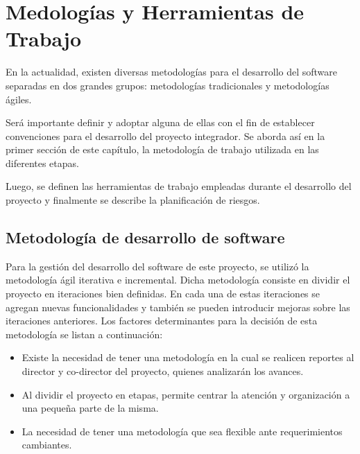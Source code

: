 
\chapter{Medologías y Herramientas de Trabajo} %

\label{Chapter5} %
En la actualidad, existen diversas metodologías para el desarrollo del software separadas en dos grandes grupos: metodologías tradicionales y metodologías ágiles. 

Será importante definir y adoptar alguna de ellas con el fin de establecer convenciones para el desarrollo del proyecto integrador. Se aborda así en la primer sección de este capítulo, la metodología de trabajo utilizada en las diferentes etapas.

Luego, se definen las herramientas de trabajo empleadas durante el desarrollo del proyecto y finalmente se describe la planificación de riesgos.


\section{Metodología de desarrollo de software}
Para la gestión del desarrollo del software de este proyecto, se utilizó la metodología ágil iterativa e incremental. Dicha metodología consiste en dividir el proyecto en iteraciones bien definidas. En cada una de estas iteraciones se agregan nuevas funcionalidades y también se pueden introducir mejoras sobre las iteraciones anteriores. Los factores determinantes para la decisión de esta metodología se listan a continuación:

\begin{itemize}
	\item Existe la necesidad de tener una metodología en la cual se realicen reportes al director y co-director del proyecto, quienes analizarán los avances.
	\item Al dividir el proyecto en etapas, permite centrar la atención y organización a una pequeña parte de la misma.
	\item La necesidad de tener una metodología que sea flexible ante requerimientos cambiantes.
\end{itemize}

